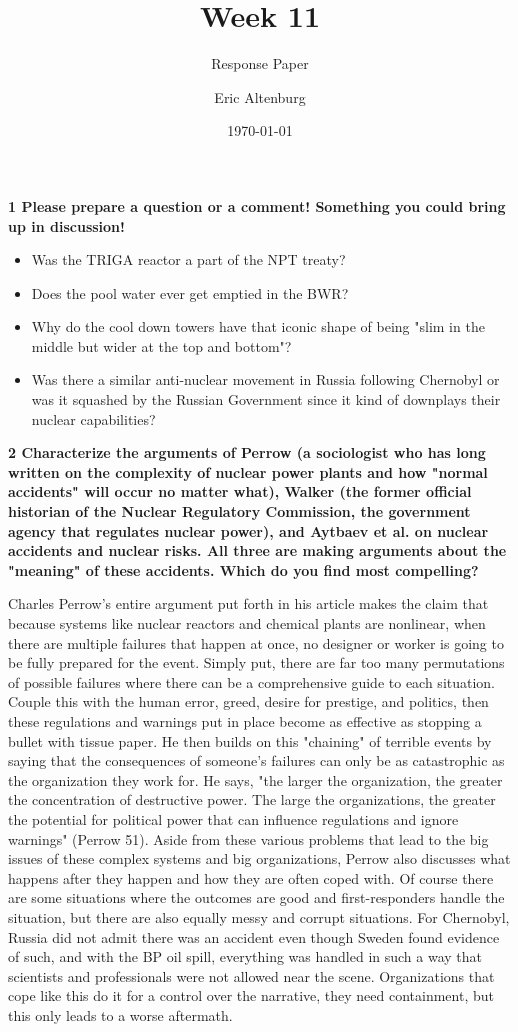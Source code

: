 \documentclass[12pt]{turabian-researchpaper}
\title{Week 11}
\subtitle{Response Paper}
\author{Eric Altenburg}
\date{\today}
\newcommand\question[2]{\noindent\textbf{#1 \quad #2}}
\begin{document}
\maketitle

\question{1}{Please prepare a question or a comment! Something you could bring up in discussion!}

	\begin{itemize}
		\item Was the TRIGA reactor a part of the NPT treaty?
		\item Does the pool water ever get emptied in the BWR?
		\item Why do the cool down towers have that iconic shape of being "slim in the middle but wider at the top and bottom"?
		\item Was there a similar anti-nuclear movement in Russia following Chernobyl or was it squashed by the Russian Government since it kind of downplays their nuclear capabilities?
	\end{itemize}

\question{2}{Characterize the arguments of Perrow (a sociologist who has long written on the complexity of nuclear power plants and how "normal accidents" will occur no matter what), Walker (the former official historian of the Nuclear Regulatory Commission, the government agency that regulates nuclear power), and Aytbaev et al. on nuclear accidents and nuclear risks. All three are making arguments about the "meaning" of these accidents. Which do you find most compelling?}
	
	Charles Perrow's entire argument put forth in his article makes the claim that because systems like nuclear reactors and chemical plants are nonlinear, when there are multiple failures that happen at once, no designer or worker is going to be fully prepared for the event. Simply put, there are far too many permutations of possible failures where there can be a comprehensive guide to each situation. Couple this with the human error, greed, desire for prestige, and politics, then these regulations and warnings put in place become as effective as stopping a bullet with tissue paper. He then builds on this "chaining" of terrible events by saying that the consequences of someone's failures can only be as catastrophic as the organization they work for. He says, "the larger the organization, the greater the concentration of destructive power. The large the organizations, the greater the potential for political power that can influence regulations and ignore warnings" (Perrow 51). Aside from these various problems that lead to the big issues of these complex systems and big organizations, Perrow also discusses what happens after they happen and how they are often coped with. Of course there are some situations where the outcomes are good and first-responders handle the situation, but there are also equally messy and corrupt situations. For Chernobyl, Russia did not admit there was an accident even though Sweden found evidence of such, and with the BP oil spill, everything was handled in such a way that scientists and professionals were not allowed near the scene. Organizations that cope like this do it for a control over the narrative, they need containment, but this only leads to a worse aftermath.
\end{document}
